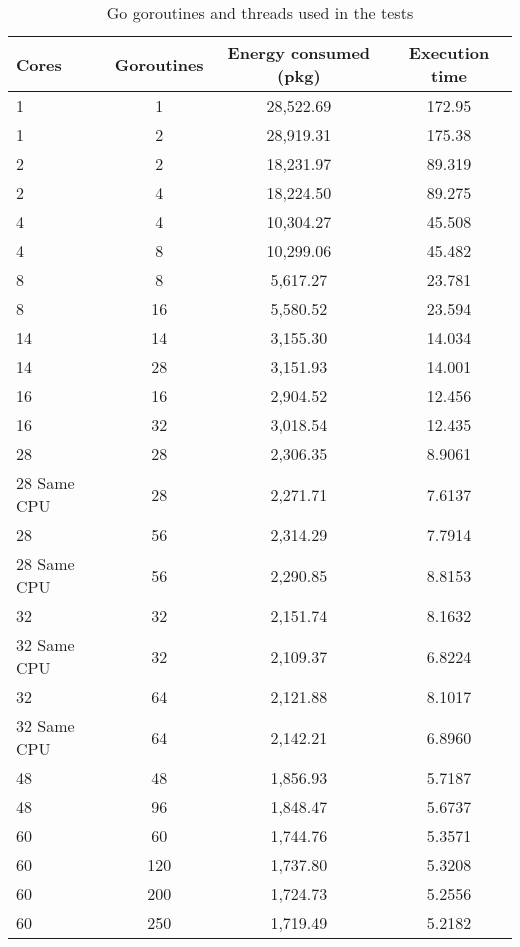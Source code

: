 \begin{table}
  \centering
  \begin{tabular}{lccc}
    \toprule
    Cores & Goroutines & Energy consumed (pkg) & Execution time \\
    \midrule
    1             & 1          &  28,522.69     &   172.95  \\ 
    1             & 2          &  28,919.31     &   175.38  \\ 
    2             & 2          &  18,231.97     &   89.319  \\
    2             & 4          &  18,224.50     &   89.275  \\
    4             & 4          &  10,304.27     &   45.508  \\
    4             & 8          &  10,299.06     &   45.482  \\
    8             & 8          &  5,617.27      &   23.781  \\
    8             & 16         &  5,580.52      &   23.594  \\
    14            & 14         &  3,155.30      &   14.034  \\
    14            & 28         &  3,151.93      &   14.001  \\
    16            & 16         &  2,904.52      &   12.456  \\
    16            & 32         &  3,018.54      &   12.435  \\
    28            & 28         &  2,306.35      &   8.9061  \\
    28 Same CPU   & 28         &  2,271.71      &   7.6137  \\
    28            & 56         &  2,314.29      &   7.7914  \\
    28 Same CPU   & 56         &  2,290.85      &   8.8153  \\
    32            & 32         &  2,151.74      &   8.1632  \\
    32 Same CPU   & 32         &  2,109.37      &   6.8224  \\
    32            & 64         &  2,121.88      &   8.1017  \\
    32 Same CPU   & 64         &  2,142.21      &   6.8960  \\
    48            & 48         &  1,856.93      &   5.7187  \\
    48            & 96         &  1,848.47      &   5.6737  \\
    60            & 60         &  1,744.76      &   5.3571  \\
    60            & 120        &  1,737.80      &   5.3208  \\
    60            & 200        &  1,724.73      &   5.2556  \\
    60            & 250        &  1,719.49      &   5.2182  \\
    \bottomrule
  \end{tabular}
  \caption{Go goroutines and threads used in the tests}
  \label{tab:go-routines-cores}
\end{table}
